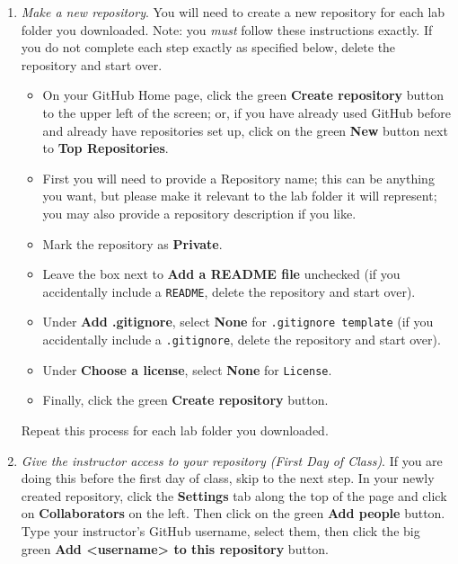 \begin{enumerate}
    \item \emph{Make a new repository}.
    You will need to create a new repository for each lab folder you downloaded.
    Note: you \emph{must} follow these instructions exactly. 
    If you do not complete each step exactly as specified below, delete the repository and start over.
    \begin{itemize}
        \item On your GitHub Home page, click the green \textbf{Create repository} button to the upper left of the screen; or, if you have already used GitHub before and already have repositories set up, click on the green \textbf{New} button next to \textbf{Top Repositories}.
        \item First you will need to provide a Repository name; this can be anything you want, but please make it relevant to the lab folder it will represent; you may also provide a repository description if you like.
        \item Mark the repository as \textbf{Private}.
        \item Leave the box next to \textbf{Add a README file} unchecked (if you accidentally include a \texttt{README}, delete the repository and start over).
        \item Under \textbf{Add .gitignore}, select \textbf{None} for \texttt{.gitignore template} (if you accidentally include a \texttt{.gitignore}, delete the repository and start over).
        \item Under \textbf{Choose a license}, select \textbf{None} for \texttt{License}.
        \item Finally, click the green \textbf{Create repository} button.
    \end{itemize}
    Repeat this process for each lab folder you downloaded.
  
    \item \emph{Give the instructor access to your repository (First Day of Class)}.
    If you are doing this before the first day of class, skip to the next step.
    In your newly created repository, click the \textbf{Settings} tab along the top of the page and click on \textbf{Collaborators} on the left.
    Then click on the green \textbf{Add people} button.
    Type your instructor's GitHub username, select them, then click the big green \textbf{Add <username> to this repository} button.


\end{enumerate}
